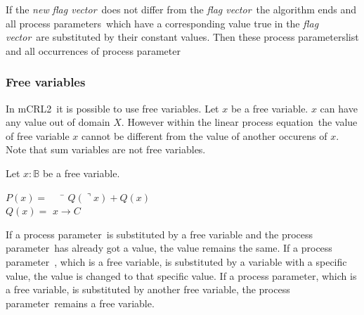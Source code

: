 \documentclass[a4paper,10pt]{article}
\theoremstyle{plain}
\theoremstyle{definition}
\newcommand{\lpe}{linear process equation}
\newcommand{\mcrl}{mCRL2}
\newcommand{\pp}{process parameter}
\newcommand{\pps}{process parameters}
\newcommand{\ti}{\textit}
\newcommand{\fv}{\textit{flag vector}}
\begin{document}
If the \ti{new} \fv\ does not differ from the \fv\ the algorithm ends and all \pps\ which have a corresponding value true in the \fv\ are substituted by their constant values. Then these \pps list and all occurrences of \pp\ 

\subsubsection{Free variables}
In \mcrl\ it is possible to use free variables. %
Let $x$ be a free variable. $x$ can have any value out of domain $X$. However within the \lpe\ the value of free variable $x$ cannot be different from the value of another occurens of $x$. Note that sum variables are not free variables.

\begin{example}
Let $x: \mathbb{B}$ be a free variable.
\begin{tabbing}
$P(x) =$ \verb"  " \= $ Q(\urcorner x) + Q(x) $ \\
$Q(x) =$ \> $ x \rightarrow C $\
\end{tabbing}

\end{example}


If a \pp\ is substituted by a free variable and the \pp\ has already got a value, the value remains the same. If a \pp\ , which is a free variable, is substituted by a variable with a specific value, the value is changed to that specific value. If a \pp , which is a free variable, is substituted by another free variable, the \pp\ remains a free variable. 
\end{document}

